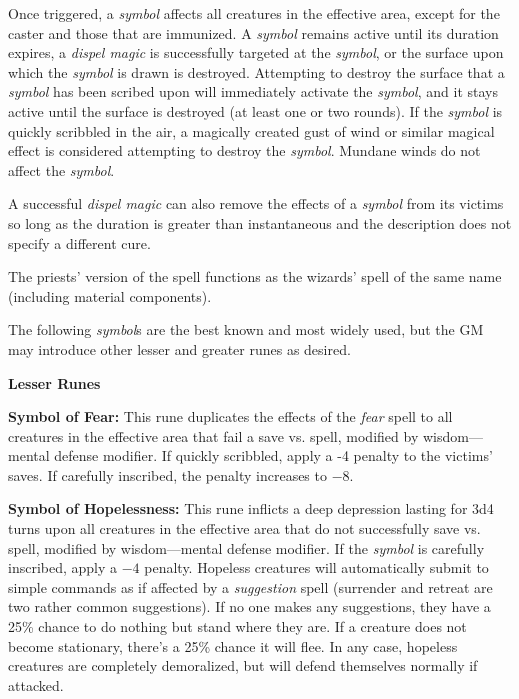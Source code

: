 \begin{multicols}{2}
Once triggered, a \textit{symbol} affects all creatures in the effective area, except for the caster and those that are immunized.  A \textit{symbol} remains active until its duration expires, a \textit{dispel magic} is successfully targeted at the \textit{symbol}, or the surface upon which the \textit{symbol} is drawn is destroyed.  Attempting to destroy the surface that a \textit{symbol} has been scribed upon will immediately activate the \textit{symbol}, and it stays active until the surface is destroyed (at least one or two rounds).  If the \textit{symbol} is quickly scribbled in the air, a magically created gust of wind or similar magical effect is considered attempting to destroy the \textit{symbol}.  Mundane winds do not affect the \textit{symbol}.  

A successful \textit{dispel magic} can also remove the effects of a \textit{symbol} from its victims so long as the duration is greater than instantaneous and the description does not specify a different cure.

The priests' version of the spell functions as the wizards' spell of the same name (including material components).

The following \textit{symbol}s are the best known and most widely used, but the GM may introduce other lesser and greater runes as desired.

\noindent \textbf{Lesser Runes}

\textbf{Symbol of Fear:} This rune duplicates the effects of the \textit{fear} spell to all creatures in the effective area that fail a save vs. spell, modified by wisdom---mental defense modifier.  If quickly scribbled, apply a -4 penalty to the victims' saves.  If carefully inscribed, the penalty increases to $-8$.

\textbf{Symbol of Hopelessness:} This rune inflicts a deep depression lasting for 3d4 turns upon all creatures in the effective area that do not successfully save vs. spell, modified by wisdom---mental defense modifier.  If the \textit{symbol} is carefully inscribed, apply a $-4$ penalty.  Hopeless creatures will automatically submit to simple commands as if affected by a \textit{suggestion} spell (surrender and retreat are two rather common suggestions).  If no one makes any suggestions, they have a 25\% chance to do nothing but stand where they are.  If a creature does not become stationary, there's a 25\% chance it will flee.  In any case, hopeless creatures are completely demoralized, but will defend themselves normally if attacked.


\end{multicols}

